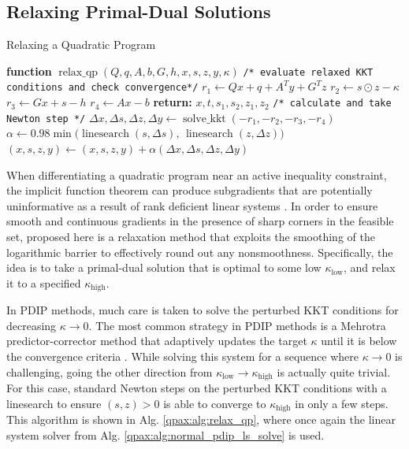 \subsection{Relaxing Primal-Dual Solutions}
\begin{algorithm}
\caption{Relaxing a Quadratic Program}\label{qpax:alg:relax_qp}
\begin{algorithmic}[1]
\State \textbf{function} $\operatorname{relax\_qp}(Q,q,A, b, G,h, x, s, z, y, \kappa)$ %
\State \texttt{/* evaluate relaxed KKT conditions and check convergence*/}
\State $r_1 \gets Qx + q  + A^Ty + G^Tz$ %
\State $r_2 \gets s \odot z - \kappa$ 
\State $r_3 \gets Gx + s - h$
\State $r_4 \gets Ax - b$
\State \textbf{return:} $x, t, s_1, s_2, z_1, z_2$
\EndIf 
\State 
\State \texttt{/* calculate and take Newton step */}
\State $\Delta x, \Delta s, \Delta z, \Delta y \gets \operatorname{solve\_kkt}(-r_1, -r_2, -r_3, -r_4)$ 
\State $\alpha \gets 0.98 \min\big(\operatorname{linesearch}(s, \Delta s),\, \operatorname{linesearch}(z, \Delta z)\big)$ \Comment{\eqref{qpax:sec:background:linesearch}}
\State $(x, s, z, y) \gets (x, s, z, y) + \alpha(\Delta x, \Delta s, \Delta z, \Delta y)$
\EndFor
\end{algorithmic}
\end{algorithm}
When differentiating a quadratic program near an active inequality constraint, the implicit function theorem can produce subgradients that are potentially uninformative as a result of rank deficient linear systems \cite{agrawal2019a}. In order to ensure smooth and continuous gradients in the presence of sharp corners in the feasible set, proposed here is a relaxation method that exploits the smoothing of the logarithmic barrier to effectively round out any nonsmoothness. Specifically, the idea is to take a primal-dual solution that is optimal to some low $\kappa_\text{low}$, and relax it to a specified $\kappa_\text{high}$.

In PDIP methods, much care is taken to solve the perturbed KKT conditions for decreasing $\kappa \rightarrow 0$. The most common strategy in PDIP methods is a Mehrotra predictor-corrector method that adaptively updates the target $\kappa$ until it is below the convergence criteria \cite{mehrotra1992}. While solving this system for a sequence where $\kappa \rightarrow 0$ is challenging, going the other direction from $\kappa_\text{low} \rightarrow \kappa_\text{high}$ is actually quite trivial. For this case, standard Newton steps on the perturbed KKT conditions with a linesearch to ensure $(s,z) > 0$ is able to converge to $\kappa_\text{high}$ in only a few steps. This algorithm is shown in Alg. \eqref{qpax:alg:relax_qp}, where once again the linear system solver from Alg. \eqref{qpax:alg:normal_pdip_ls_solve} is used. 

